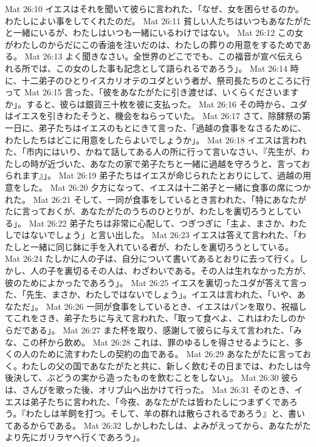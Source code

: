 Mat 26:10  イエスはそれを聞いて彼らに言われた、「なぜ、女を困らせるのか。わたしによい事をしてくれたのだ。
Mat 26:11  貧しい人たちはいつもあなたがたと一緒にいるが、わたしはいつも一緒にいるわけではない。
Mat 26:12  この女がわたしのからだにこの香油を注いだのは、わたしの葬りの用意をするためである。
Mat 26:13  よく聞きなさい。全世界のどこででも、この福音が宣べ伝えられる所では、この女のした事も記念として語られるであろう」。
Mat 26:14  時に、十二弟子のひとりイスカリオテのユダという者が、祭司長たちのところに行って
Mat 26:15  言った、「彼をあなたがたに引き渡せば、いくらくださいますか」。すると、彼らは銀貨三十枚を彼に支払った。
Mat 26:16  その時から、ユダはイエスを引きわたそうと、機会をねらっていた。
Mat 26:17  さて、除酵祭の第一日に、弟子たちはイエスのもとにきて言った、「過越の食事をなさるために、わたしたちはどこに用意をしたらよいでしょうか」。
Mat 26:18  イエスは言われた、「市内にはいり、かねて話してある人の所に行って言いなさい、『先生が、わたしの時が近づいた、あなたの家で弟子たちと一緒に過越を守ろうと、言っておられます』」。
Mat 26:19  弟子たちはイエスが命じられたとおりにして、過越の用意をした。
Mat 26:20  夕方になって、イエスは十二弟子と一緒に食事の席につかれた。
Mat 26:21  そして、一同が食事をしているとき言われた、「特にあなたがたに言っておくが、あなたがたのうちのひとりが、わたしを裏切ろうとしている」。
Mat 26:22  弟子たちは非常に心配して、つぎつぎに「主よ、まさか、わたしではないでしょう」と言い出した。
Mat 26:23  イエスは答えて言われた、「わたしと一緒に同じ鉢に手を入れている者が、わたしを裏切ろうとしている。
Mat 26:24  たしかに人の子は、自分について書いてあるとおりに去って行く。しかし、人の子を裏切るその人は、わざわいである。その人は生れなかった方が、彼のためによかったであろう」。
Mat 26:25  イエスを裏切ったユダが答えて言った、「先生、まさか、わたしではないでしょう」。イエスは言われた、「いや、あなただ」。
Mat 26:26  一同が食事をしているとき、イエスはパンを取り、祝福してこれをさき、弟子たちに与えて言われた、「取って食べよ、これはわたしのからだである」。
Mat 26:27  また杯を取り、感謝して彼らに与えて言われた、「みな、この杯から飲め。
Mat 26:28  これは、罪のゆるしを得させるようにと、多くの人のために流すわたしの契約の血である。
Mat 26:29  あなたがたに言っておく。わたしの父の国であなたがたと共に、新しく飲むその日までは、わたしは今後決して、ぶどうの実から造ったものを飲むことをしない」。
Mat 26:30  彼らは、さんびを歌った後、オリブ山へ出かけて行った。
Mat 26:31  そのとき、イエスは弟子たちに言われた、「今夜、あなたがたは皆わたしにつまずくであろう。『わたしは羊飼を打つ。そして、羊の群れは散らされるであろう』と、書いてあるからである。
Mat 26:32  しかしわたしは、よみがえってから、あなたがたより先にガリラヤへ行くであろう」。
